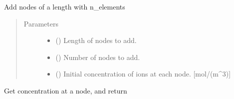 \documentclass[letterpaper,10pt,english]{sphinxmanual}
\begin{document}
\begin{fulllineitems}
\begin{fulllineitems}
\label{\detokenize{mesh:mesh.Mesh1D_SPM.add_nodes}}
\sphinxAtStartPar
Add nodes of a length with n\_elements
\begin{quote}\begin{description}
\item[{Parameters}] \leavevmode\begin{itemize}
\item {} 
\sphinxAtStartPar
{} (\sphinxstyleliteralemphasis{\sphinxupquote{{[}}}\sphinxstyleliteralemphasis{\sphinxupquote{{]}}}) \textendash{} Length of nodes to add.

\item {} 
\sphinxAtStartPar
{} (\sphinxstyleliteralemphasis{\sphinxupquote{{[}}}\sphinxstyleliteralemphasis{\sphinxupquote{{]}}}) \textendash{} Number of nodes to add.

\item {} 
\sphinxAtStartPar
{} (\sphinxstyleliteralemphasis{\sphinxupquote{{[}}}\sphinxstyleliteralemphasis{\sphinxupquote{{]}}}) \textendash{} Initial concentration of ions at each node. {[}mol/(m\textasciicircum{}3){]}

\end{itemize}

\end{description}\end{quote}

\end{fulllineitems}


\begin{fulllineitems}
\label{\detokenize{mesh:mesh.Mesh1D_SPM.get_concentration_by_id}}
\sphinxAtStartPar
Get concentration at a node, and return


\end{fulllineitems}
\end{fulllineitems}
\end{document}
